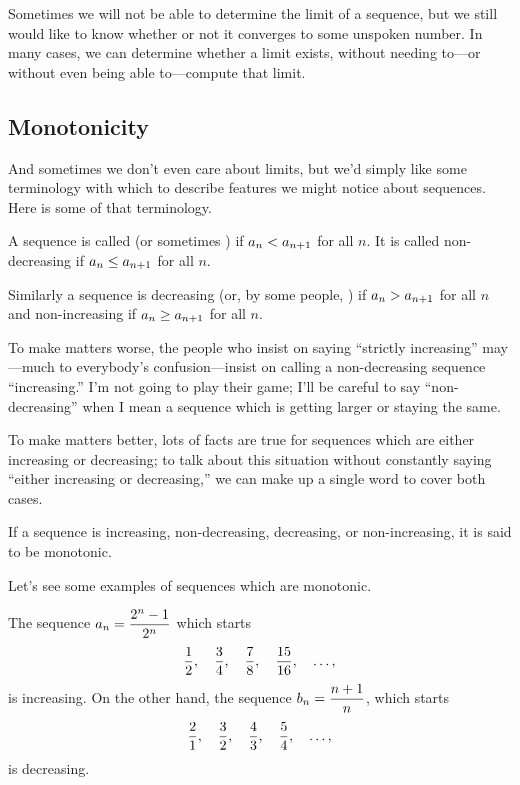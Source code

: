 Sometimes we will not be able to determine the limit of a sequence,
but we still would like to know whether or not it converges to some
unspoken number.  In many cases, we can determine whether a limit
exists, without needing to---or without even being able to---compute
that limit.

\subsection{Monotonicity}

And sometimes we don't even care about limits, but we'd simply like
some terminology with which to describe features we might notice about
sequences.  Here is some of that terminology.


\begin{definition}
  A sequence is called
   (or sometimes
  ) if $\displaystyle a_n<a_{n+1}$ for all $n$.
  It is called {\dfont
    non-decreasing\/} if $\displaystyle a_n\le
  a_{n+1}$ for all $n$.

  Similarly a sequence is {\dfont
    decreasing\/} (or, by some people,
  ) if $\displaystyle a_n>a_{n+1}$ for all $n$ and
  {\dfont non-increasing\/} if $\displaystyle
  a_n\ge a_{n+1}$ for all $n$.
\end{definition}
To make matters worse, the people who insist on saying ``strictly
increasing'' may---much to everybody's confusion---insist on calling a
non-decreasing sequence ``increasing.'' I'm not going to play their
game; I'll be careful to say ``non-decreasing'' when I mean a sequence
which is getting larger or staying the same.

To make matters better, lots of facts are true for sequences which are
either increasing or decreasing; to talk about this situation without
constantly saying ``either increasing or decreasing,'' we can make up
a single word to cover both cases.
\begin{definition}
  If a sequence is increasing, non-decreasing, decreasing, or
  non-increasing, it is said to be {\dfont
    monotonic\/}.
\end{definition}

Let's see some examples of sequences which are monotonic.
\begin{example}
The sequence $\displaystyle a_n = {2^n-1\over2^n}$ which starts
$$
  {1\over2},\quad {3\over4},\quad {7\over8},\quad {15\over16},\quad \ldots,
$$
is increasing.  On the other hand, the sequence $\displaystyle b_n = {n+1\over n}$, which starts
$$ 
  {2\over1},\quad{3\over2},\quad{4\over3},\quad{5\over4},\quad\ldots,
$$
is decreasing.
\end{example}


